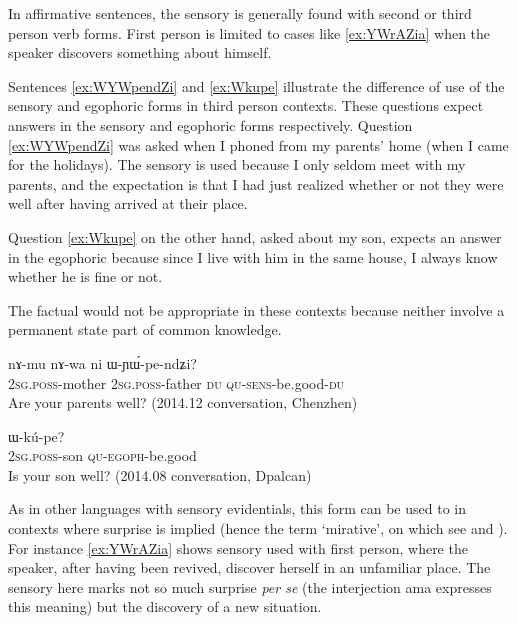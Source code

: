 \documentclass[oldfontcommands,oneside,a4paper,11pt]{article}
\newcommand{\ipa}[1]{{\phon \mbox{#1}}} %
\begin{document}
In affirmative sentences, the sensory is generally found with second or third person verb forms. First person is limited to  cases like \ref{ex:YWrAZia} when the speaker discovers something about himself.

Sentences \ref{ex:WYWpendZi} and \ref{ex:Wkupe} illustrate the difference of use of the sensory and egophoric forms in third person contexts. These questions expect answers in the sensory and egophoric forms respectively. Question \ref{ex:WYWpendZi} was asked when I phoned from my parents' home (when I came for the holidays). The sensory is used because I only seldom meet with my parents, and the expectation is that I had just realized whether or not they were well after having arrived at their place. 

Question \ref{ex:Wkupe} on the other hand, asked about my son, expects an answer in the egophoric because since I live with him in the same house, I always know whether he is fine or not.

The factual would not be appropriate in these contexts because neither involve a permanent state part of common knowledge.

\begin{exe}
\ex \label{ex:WYWpendZi}
\gll 
\ipa{nɤ-mu}  	\ipa{nɤ-wa}  	\ipa{ni}  	\ipa{ɯ-ɲɯ́-pe-ndʑi?}  \\
\textsc{2sg.poss}-mother \textsc{2sg.poss}-father \textsc{du} \textsc{qu-sens}-be.good-\textsc{du} \\
\glt Are your parents well? (2014.12 conversation, Chenzhen)
\end{exe}


\begin{exe}
\ex \label{ex:Wkupe}
\gll \ipa{nɤ-tɕɯ} \ipa{ɯ-kú-pe?}\\
\textsc{2sg.poss}-son \textsc{qu-egoph}-be.good\\
\glt Is your son well? (2014.08 conversation, Dpalcan)
\end{exe}

 
 As in other languages with sensory evidentials, this form can be used to in contexts where surprise is implied (hence the term `mirative', on which see \citealt{delancey97mirative} and \citealt{hill12mirativity}). For instance \ref{ex:YWrAZia} shows sensory used with first person, where the speaker, after having been revived, discover herself in an unfamiliar place. The sensory here marks not so much surprise \textit{per se} (the interjection \ipa{ama} expresses this meaning) but the discovery of a new situation.
\end{document}
